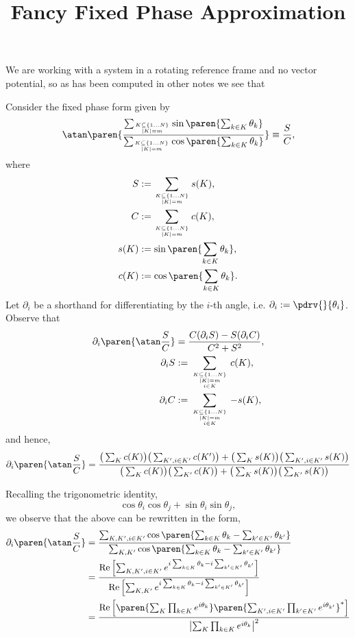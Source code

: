 \documentclass[onecolumn,amsmath,amssymb,nofootinbib,floatfix]{revtex4}
\title{Fancy Fixed Phase Approximation}
\begin{document}
We are working with a system in a rotating reference frame and no vector potential, so as has been computed in other notes we see that

Consider the fixed phase form given by
$$\atan\paren{\frac{\sum_{K\subseteq \{1\dots N\}\atop |K|=m} \sin\paren{\sum_{k\in K} \theta_k}}{\sum_{K\subseteq \{1\dots N\}\atop |K|=m} \cos\paren{\sum_{k\in K} \theta_k}}}\equiv\frac{S}{C},
$$
where
$$
\begin{aligned}
S&:=\sum_{K\subseteq \{1\dots N\}\atop |K|=m} s(K),\\
C&:=\sum_{K\subseteq \{1\dots N\}\atop |K|=m} c(K),\\
s(K)&:=\sin\paren{\sum_{k\in K} \theta_k},\\
c(K)&:=\cos\paren{\sum_{k\in K} \theta_k}.\\
\end{aligned}
$$
Let $\partial_i$ be a shorthand for differentiating by the $i$-th angle, i.e. $\partial_i:=\pdrv{}{\theta_i}$.  Observe that
$$
\begin{aligned}
\partial_i \paren{\atan\frac{S}{C}} &= \frac{C(\partial_i S) - S(\partial_i C)}{C^2+S^2},\\
\partial_i S&:=\sum_{{K\subseteq \{1\dots N\}\atop |K|=m}\atop i\in K} c(K),\\
\partial_i C&:=\sum_{{K\subseteq \{1\dots N\}\atop |K|=m}\atop i\in K} -s(K),\\
\end{aligned}
$$
and hence,
$$
\partial_i \paren{\atan\frac{S}{C}} = \frac{\big(\sum_K c(K)\big)\big(\sum_{K',i\in K'} c(K')\big)+\big(\sum_K s(K)\big)\big(\sum_{K',i\in K'} s(K)\big)}{\big(\sum_K c(K)\big)\big(\sum_{K'} c(K)\big)+\big(\sum_K s(K)\big)\big(\sum_{K'} s(K)\big)}
$$

Recalling the trigonometric identity,
$$\cos\theta_i\cos\theta_j+\sin\theta_i\sin\theta_j,$$
we observe that the above can be rewritten in the form,
$$
\begin{aligned}
\partial_i \paren{\atan\frac{S}{C}}
&= \frac{\sum_{K,K',i\in K'}\cos\paren{\sum_{k\in K} \theta_k - \sum_{k'\in K'} \theta_{k'}}}
        {\sum_{K,K'}\cos\paren{\sum_{k\in K} \theta_k - \sum_{k'\in K'} \theta_{k'}}}\\
&= \frac{\text{Re}\left[\sum_{K,K',i\in K'}e^{i\sum_{k\in K} \theta_k-i\sum_{k'\in K'} \theta_{k'}}\right]}
        {\text{Re}\left[\sum_{K,K'}e^{i\sum_{k\in K} \theta_k-i\sum_{k'\in K'} \theta_{k'}}\right]}\\
&= \frac{\text{Re}\left[\paren{\sum_{K}\prod_{k\in K}e^{i\theta_k}}\paren{\sum_{K',i\in K'}\prod_{k'\in K'}e^{i\theta_{k'}}}^*\right]}
        {\left|\sum_{K}\prod_{k\in K}e^{i\theta_k}\right|^2}\\
\end{aligned}
$$
\end{document}

